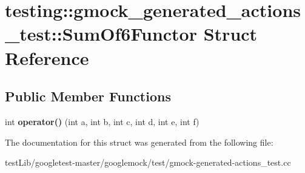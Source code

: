 \hypertarget{structtesting_1_1gmock__generated__actions__test_1_1SumOf6Functor}{}\section{testing\+:\+:gmock\+\_\+generated\+\_\+actions\+\_\+test\+:\+:Sum\+Of6\+Functor Struct Reference}
\label{structtesting_1_1gmock__generated__actions__test_1_1SumOf6Functor}
\subsection*{Public Member Functions}
\begin{DoxyCompactItemize}
\item 
\mbox{\label{structtesting_1_1gmock__generated__actions__test_1_1SumOf6Functor_adb500f7bdfa5a5887623fa38cd805e41}} 
int {\bfseries operator()} (int a, int b, int c, int d, int e, int f)
\end{DoxyCompactItemize}


The documentation for this struct was generated from the following file\+:\begin{DoxyCompactItemize}
\item 
test\+Lib/googletest-\/master/googlemock/test/gmock-\/generated-\/actions\+\_\+test.\+cc\end{DoxyCompactItemize}
